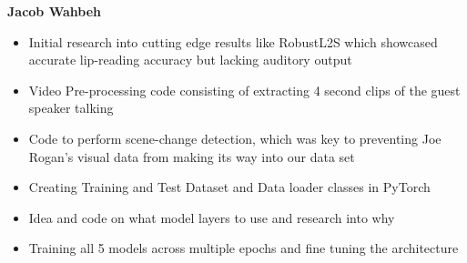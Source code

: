 \documentclass[10pt,twocolumn,letterpaper]{article}
\begin{document}
\textbf{{Jacob Wahbeh}}
\begin{itemize}
    \item Initial research into cutting edge results like RobustL2S which showcased accurate lip-reading accuracy but lacking auditory output
    \item Video Pre-processing code consisting of extracting 4 second clips of the guest speaker talking
    \item Code to perform scene-change detection, which was key to preventing Joe Rogan's visual data from making its way into our data set
    \item Creating Training and Test Dataset and Data loader classes in PyTorch
    \item Idea and code on what model layers to use and research into why
    \item Training all 5 models across multiple epochs and fine tuning the architecture
\end{itemize}











{\small


}
\end{document}
